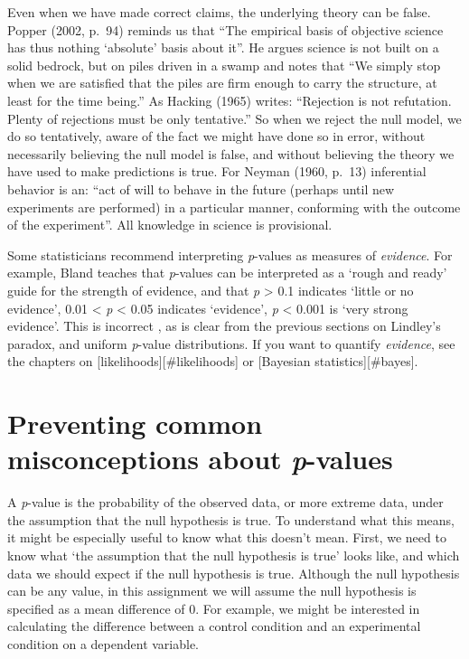 \documentclass[
]{krantz}
\begin{document}
Even when we have made correct claims, the underlying theory can be false. Popper (2002, p.~94) reminds us that ``The empirical basis of objective science has thus nothing `absolute' basis about it''. He argues science is not built on a solid bedrock, but on piles driven in a swamp and notes that ``We simply stop when we are satisfied that the piles are firm enough to carry the structure, at least for the time being.'' As Hacking (1965) writes: ``Rejection is not refutation. Plenty of rejections must be only tentative.'' So when we reject the null model, we do so tentatively, aware of the fact we might have done so in error, without necessarily believing the null model is false, and without believing the theory we have used to make predictions is true. For Neyman (1960, p.~13) inferential behavior is an: ``act of will to behave in the future (perhaps until new experiments are performed) in a particular manner, conforming with the outcome of the experiment''. All knowledge in science is provisional.

Some statisticians recommend interpreting \emph{p}-values as measures of \emph{evidence}. For example, Bland \citeyearpar{bland_introduction_2015} teaches that \emph{p}-values can be interpreted as a `rough and ready' guide for the strength of evidence, and that \emph{p} \textgreater{} 0.1 indicates `little or no evidence', 0.01 \textless{} \emph{p} \textless{} 0.05 indicates `evidence', \emph{p} \textless{} 0.001 is `very strong evidence'. This is incorrect \citep{lakens_why_2022}, as is clear from the previous sections on Lindley's paradox, and uniform \emph{p}-value distributions. If you want to quantify \emph{evidence}, see the chapters on {[}likelihoods{]}{[}\#likelihoods{]} or {[}Bayesian statistics{]}{[}\#bayes{]}.

\hypertarget{misconceptions}{%
\section{\texorpdfstring{Preventing common misconceptions about \emph{p}-values}{Preventing common misconceptions about p-values}}\label{misconceptions}}

A \emph{p}-value is the probability of the observed data, or more extreme data, under the assumption that the null hypothesis is true. To understand what this means, it might be especially useful to know what this doesn't mean. First, we need to know what `the assumption that the null hypothesis is true' looks like, and which data we should expect if the null hypothesis is true. Although the null hypothesis can be any value, in this assignment we will assume the null hypothesis is specified as a mean difference of 0. For example, we might be interested in calculating the difference between a control condition and an experimental condition on a dependent variable.
\end{document}
